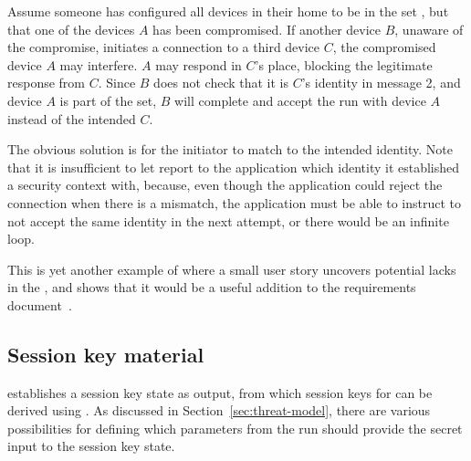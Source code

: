 \documentclass[runningheads,draft,x11names]{llncs}
\begin{document}
%
Assume someone has configured all devices in their home to be in the 
set , but that one of the devices $A$ has been compromised.
%
If another device $B$, unaware of the compromise, initiates a connection to a
third device $C$, the compromised device $A$ may interfere.
%
$A$ may respond in $C$'s place, blocking the legitimate response from $C$.
%
Since $B$ does not check that it is $C$'s identity in message 2, and device $A$
is part of the  set, $B$ will complete and accept the \mEdhoc{} run
with device $A$ instead of the intended $C$.

%
The obvious solution is for the initiator to match \mIdcredr{} to the intended
identity.
%
Note that it is insufficient to let \mEdhoc{} report to the application which
identity it established a security context with, because, even though the
application could reject the connection when there is a mismatch, the
application must be able to instruct \mEdhoc{} to not accept the same identity in the 
next attempt, or there would be an infinite loop.
%

This is yet another example of where a small user story uncovers
potential lacks in the \mSpec, and shows that it would be a useful addition to
the requirements document~\cite{ietf-lake-reqs-04}.
%
%


\subsection{Session key material}
\label{sec:sessionKeyMaterial}
\mEdhoc{} establishes a session key state as output, from which session keys for
\mOscore{} can be derived using \mHkdf{}.
%
As discussed in Section~\ref{sec:threat-model}, there are various
possibilities for defining which parameters from the \mEdhoc{} run should
provide the secret input to the session key state.
\end{document}
